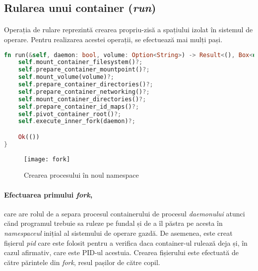         \subsection{Rularea unui container (\textit{run})} \label{section:run}
            \paragraph{} Operația de rulare reprezintă crearea propriu-zisă a spațiului izolat în sistemul de operare. Pentru realizarea acestei operații, se efectuează mai mulți pași.
            \begin{lstlisting}[language=Rust, style=boxed, caption={Rularea unui container},captionpos=b]
fn run(&self, daemon: bool, volume: Option<String>) -> Result<(), Box<dyn std::error::Error>> {
    self.mount_container_filesystem()?;
    self.prepare_container_mountpoint()?;
    self.mount_volume(volume)?;
    self.prepare_container_directories()?;
    self.prepare_container_networking()?;
    self.mount_container_directories()?;
    self.prepare_container_id_maps()?;
    self.pivot_container_root()?;
    self.execute_inner_fork(daemon)?;

    Ok(())
}           \end{lstlisting}
            \label{fig:cod_crun}
            \begin{figure}[h!]
                \centering
                \texttt{[image: fork]}
                \caption{Crearea procesului în noul namespace}
                \label{fig:fork}
            \end{figure}
            \paragraph{Efectuarea primului \textit{fork},} care are rolul de a separa procesul containerului de procesul \textit{daemonului} atunci cănd programul trebuie sa ruleze pe fundal și de a îl păstra pe acesta în \textit{namespaceul} inițial al sistemului de operare gazdă. De asemenea, este creat fișierul \textit{pid} care este folosit pentru a verifica daca container-ul rulează deja și, în cazul afirmativ, care este PID-ul acestuia. Crearea fișierului este efectuată de către părintele din \textit{fork}, resul pașilor de către copil.
